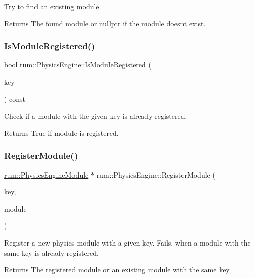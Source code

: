 Try to find an existing module. \begin{DoxyReturn}{Returns}
The found module or nullptr if the module doesn\textquotesingle{}t exist. 
\end{DoxyReturn}
\mbox{\label{classrum_1_1_physics_engine_a625ab8e7b852ad91d97df5600bfd32a2}} 
\subsubsection{\texorpdfstring{Is\+Module\+Registered()}{IsModuleRegistered()}}
{\footnotesize\ttfamily bool rum\+::\+Physics\+Engine\+::\+Is\+Module\+Registered (\begin{DoxyParamCaption}\item[{const std\+::string \&}]{key }\end{DoxyParamCaption}) const}

Check if a module with the given key is already registered. \begin{DoxyReturn}{Returns}
True if module is registered. 
\end{DoxyReturn}
\mbox{\label{classrum_1_1_physics_engine_ac8e1bad8e3f99070fa79be045ff40463}} 
\subsubsection{\texorpdfstring{Register\+Module()}{RegisterModule()}}
{\footnotesize\ttfamily \hyperlink{classrum_1_1_physics_engine_module}{rum\+::\+Physics\+Engine\+Module} $\ast$ rum\+::\+Physics\+Engine\+::\+Register\+Module (\begin{DoxyParamCaption}\item[{const std\+::string \&}]{key,  }\item[{\hyperlink{classrum_1_1_physics_engine_module}{Physics\+Engine\+Module} $\ast$}]{module }\end{DoxyParamCaption})}

Register a new physics module with a given key. Fails, when a module with the same key is already registered. \begin{DoxyReturn}{Returns}
The registered module or an existing module with the same key. 
\end{DoxyReturn}
\mbox{\label{classrum_1_1_physics_engine_a1ea5fff27011701817f5acabb69e072c}} 
